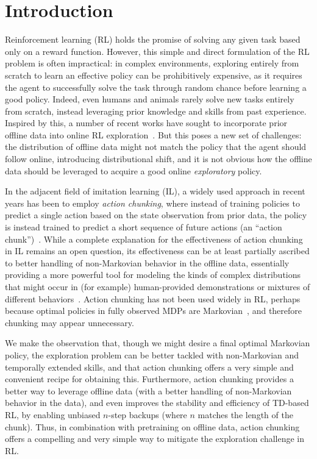

\section{Introduction}
\label{sec:intro}
Reinforcement learning (RL) holds the promise of solving any given task based only on a reward function. However, this simple and direct formulation of the RL problem is often impractical: in complex environments, exploring entirely from scratch to learn an effective policy can be prohibitively expensive, as it requires the agent to successfully solve the task through random chance before learning a good policy. Indeed, even humans and animals rarely solve new tasks entirely from scratch, instead leveraging prior knowledge and skills from past experience. Inspired by this, a number of recent works have sought to incorporate prior offline data into online RL exploration~\citep{hu2023unsupervised, li2024accelerating, wilcoxson2024leveraging}.
But this poses a new set of challenges: the distribution of offline data might not match the policy that the agent should follow online, introducing distributional shift, and it is not obvious how the offline data should be leveraged to acquire a good online \emph{exploratory} policy.

In the adjacent field of imitation learning (IL), a widely used approach in recent years has been to employ \emph{action chunking}, where instead of training policies to predict a single action based on the state observation from prior data, the policy is instead trained to predict a short sequence of future actions (an ``action chunk'')~\citep{zhao2023learning, chi2023diffusion}. While a complete explanation for the effectiveness of action chunking in IL remains an open question, its effectiveness can be at least partially ascribed to better handling of non-Markovian behavior in the offline data, essentially providing a more powerful tool for modeling the kinds of complex distributions that might occur in (for example) human-provided demonstrations or mixtures of different behaviors~\citep{zhao2023learning}. Action chunking has not been used widely in RL, perhaps because optimal policies in fully observed MDPs are Markovian~\citep{sutton1998reinforcement}, and therefore chunking may appear unnecessary. 

We make the observation that, though we might desire a final optimal Markovian policy, the exploration problem can be better tackled with non-Markovian and temporally extended skills, and that action chunking offers a very simple and convenient recipe for obtaining this. Furthermore, action chunking provides a better way to leverage offline data (with a better handling of non-Markovian behavior in the data), and even improves the stability and efficiency of TD-based RL, by enabling unbiased $n$-step backups (where $n$ matches the length of the chunk). Thus, in combination with pretraining on offline data, action chunking offers a compelling and very simple way to mitigate the exploration challenge in RL. 

